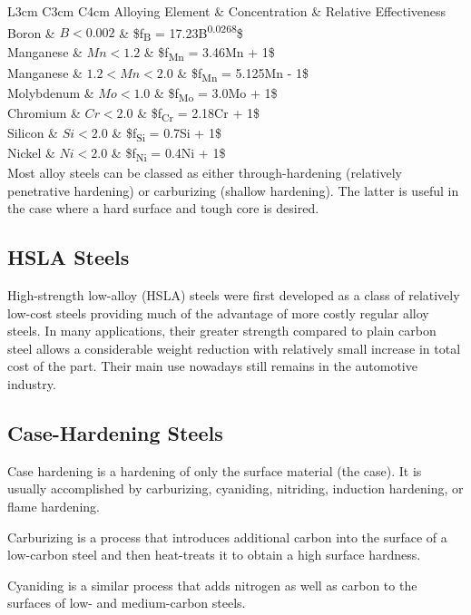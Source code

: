\documentclass[a4paper,openany,12pt]{book}
\begin{document}
 L3cm C3cm C4cm Alloying Element \& Concentration \& Relative
Effectiveness\\
Boron \& \(B < 0.002\) \& \$f\textsubscript{B} = 17.23B\textsuperscript{0.0268}\$\\
Manganese \& \(Mn < 1.2\) \& \$f\textsubscript{Mn} = 3.46Mn + 1\$\\
Manganese \& \(1.2 < Mn < 2.0\) \& \$f\textsubscript{Mn} = 5.125Mn - 1\$\\
Molybdenum \& \(Mo < 1.0\) \& \$f\textsubscript{Mo} = 3.0Mo + 1\$\\
Chromium \& \(Cr < 2.0\) \& \$f\textsubscript{Cr} = 2.18Cr + 1\$\\
Silicon \& \(Si < 2.0\) \& \$f\textsubscript{Si} = 0.7Si + 1\$\\
Nickel \& \(Ni < 2.0\) \& \$f\textsubscript{Ni} = 0.4Ni + 1\$\\

Most alloy steels can be classed as either through-hardening (relatively
penetrative hardening) or carburizing (shallow hardening). The latter is
useful in the case where a hard surface and tough core is desired.

\subsection{HSLA Steels}
\label{hsla-steels}
High-strength low-alloy (HSLA) steels were first developed as a class of
relatively low-cost steels providing much of the advantage of more
costly regular alloy steels. In many applications, their greater
strength compared to plain carbon steel allows a considerable weight
reduction with relatively small increase in total cost of the part.
Their main use nowadays still remains in the automotive industry.

\subsection{Case-Hardening Steels}
\label{case-hardening-steels}
Case hardening is a hardening of only the surface material (the case).
It is usually accomplished by carburizing, cyaniding, nitriding,
induction hardening, or flame hardening.

Carburizing is a process that introduces additional carbon into the
surface of a low-carbon steel and then heat-treats it to obtain a high
surface hardness.

Cyaniding is a similar process that adds nitrogen as well as carbon to
the surfaces of low- and medium-carbon steels.
\end{document}
